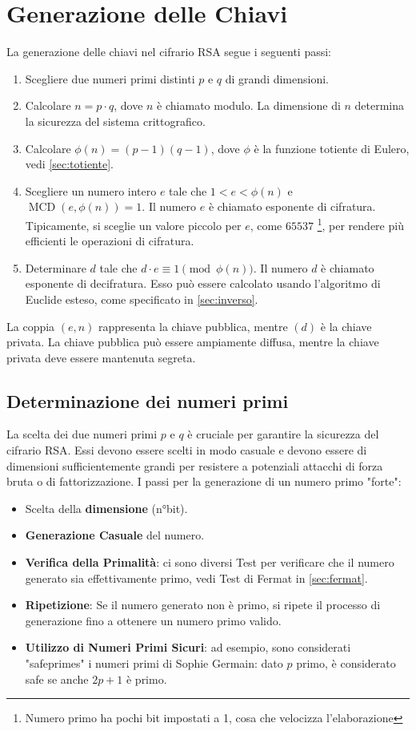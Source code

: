 \documentclass[a4paper,12pt]{report}
\begin{document}
\section{Generazione delle Chiavi}
La generazione delle chiavi nel cifrario RSA segue i seguenti passi:

\begin{enumerate}
    \item Scegliere due numeri primi distinti $p$ e $q$ di grandi dimensioni.
    \item Calcolare $n = p \cdot q$, dove $n$ è chiamato modulo. La dimensione di $n$ determina la sicurezza del sistema crittografico.
    \item Calcolare $\phi(n) = (p - 1)(q - 1)$, dove $\phi$ è la funzione totiente di Eulero, vedi \ref{sec:totiente}.
    \item Scegliere un numero intero $e$ tale che $1 < e < \phi(n)$ e $\operatorname{MCD}(e, \phi(n)) = 1$. Il numero $e$ è chiamato esponente di cifratura. Tipicamente, si sceglie un valore piccolo per $e$, come $65537$ \footnote{Numero primo ha pochi bit impostati a 1, cosa che velocizza l'elaborazione}, per rendere più efficienti le operazioni di cifratura.
    \item Determinare $d$ tale che $d \cdot e \equiv 1 \pmod{\phi(n)}$. Il numero $d$ è chiamato esponente di decifratura. Esso può essere calcolato usando l'algoritmo di Euclide esteso, come specificato in \ref{sec:inverso}.
\end{enumerate}

La coppia $(e, n)$ rappresenta la chiave pubblica, mentre $(d)$ è la chiave privata. La chiave pubblica può essere ampiamente diffusa, mentre la chiave privata deve essere mantenuta segreta.

\subsection*{Determinazione dei numeri primi}
La scelta dei due numeri primi $p$ e $q$ è cruciale per garantire la sicurezza del cifrario RSA. 
Essi devono essere scelti in modo casuale e devono essere di dimensioni sufficientemente grandi per resistere a potenziali attacchi di forza bruta o di fattorizzazione.
I passi per la generazione di un numero primo "forte":

\begin{itemize}
    \item{Scelta della \textbf{dimensione} (n°bit).}
    \item{\textbf{Generazione Casuale} del numero.} 
    \item{\textbf{Verifica della Primalità}: ci sono diversi Test per verificare che il numero generato sia effettivamente primo, vedi Test di Fermat in \ref{sec:fermat}.}
    \item{\textbf{Ripetizione}: Se il numero generato non è primo, si ripete il processo di generazione fino a ottenere un numero primo valido.}
    \item{\textbf{Utilizzo di Numeri Primi Sicuri}: ad esempio, sono considerati "safeprimes" i numeri primi di Sophie Germain: dato $p$ primo, è considerato safe se anche \(2p+1\) è primo. \cite{boneh2005}}
\end{itemize}
\end{document}
